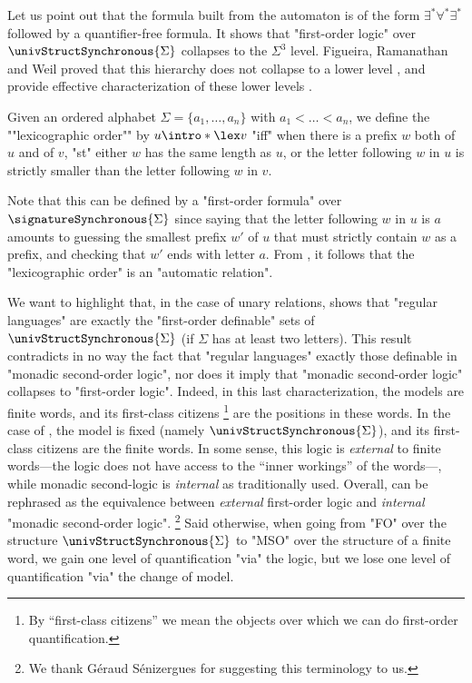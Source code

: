 Let us point out that the formula built from the automaton is of the form
$\exists^* \forall^* \exists^*$ followed by a quantifier-free formula.
It shows that "first-order logic" over $\univStructSynchronous{\Sigma}$
collapses to the $\Sigma^3$ level. Figueira, Ramanathan and Weil
proved that this hierarchy does not collapse to a lower level 
\cite[Theorem~3]{FigueiraRamanathanWeil2019QuantifierAlternation},
and provide effective characterization of these lower levels
\cite[Theorem~9]{FigueiraRamanathanWeil2019QuantifierAlternation}.

\begin{example}
	\AP\label{ex:lexicographic-is-automatic}
	Given an ordered alphabet $\Sigma = \{a_1,\dotsc,a_n\}$ with $a_1 < \dotsc < a_n$,
	we define the \AP""lexicographic order"" by $u \intro*\lex v$ "iff" when there is 
	a prefix $w$ both of $u$ and of $v$, "st" either $w$ has the same length as $u$,
	or the letter following $w$ in $u$ is strictly smaller than the letter following $w$ in $v$.
	
	Note that this can be defined by a "first-order formula" over $\signatureSynchronous{\Sigma}$
	since saying that the letter following $w$ in $u$ is $a$ amounts to
	guessing the smallest prefix $w'$ of $u$ that must strictly contain $w$ as a prefix,
	and checking that $w'$ ends with letter $a$.
	From , it follows that the "lexicographic order"
	is an "automatic relation".
\end{example}

\begin{remark}
	\AP\label{rk:internal-vs-external-logic}
	We want to highlight that, in the case of unary relations,
	 shows that "regular languages" are exactly
	the "first-order definable" sets of $\univStructSynchronous{\Sigma}$
	(if $\Sigma$ has at least two letters).
	This result contradicts in no way the fact that "regular languages" exactly those definable
	in "monadic second-order logic", nor does it imply that "monadic second-order logic"
	collapses to "first-order logic". Indeed, in this last characterization,
	the models are finite words, and its first-class citizens%
	\footnote{By ``first-class citizens'' we mean the objects over which
	we can do first-order quantification.} are the positions in these words.
	In the case of , the model is fixed (namely $\univStructSynchronous{\Sigma}$), and its first-class citizens are the finite words.
	In some sense, this logic is \emph{external} to finite words---the logic does not have access to the
	``inner workings'' of the words---, while monadic second-logic is \emph{internal}
	as traditionally used.
	Overall,  can be rephrased as the equivalence between
	\emph{external} first-order logic and \emph{internal} "monadic second-order logic".%
	\footnote{We thank Géraud Sénizergues for suggesting this terminology to us.}
	Said otherwise, when going from "FO" over the structure $\univStructSynchronous{\Sigma}$ to "MSO" 
	over the structure of a finite word, we gain one level of quantification "via" the logic,
	but we lose one level of quantification "via" the change of model.
\end{remark}

